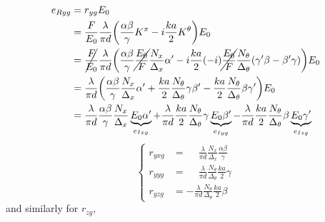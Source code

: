 \begin{align*}
    e_{\R yg}
    &= r_{yg} E_0
    \\
    &= \frac{F}{E_0}
       \frac{\lambda}{\pi d}
       \left(
           \frac{\alpha \beta}{\gamma}
           K^x
           -
           i
           \frac{ka}{2}
           K^\theta           
       \right)
       E_0
    \\
    &= \cancel{\frac{F}{E_0}}
       \frac{\lambda}{\pi d}
       \left(
           \frac{\alpha \beta}{\gamma}
           \cancel{\frac{E_0}{F}}
           \frac{N_x}{\Delta_x}
           \alpha'
           -
           i
           \frac{ka}{2}
           (-i)
           \cancel{\frac{E_0}{F}}
           \frac{N_\theta}{\Delta_\theta}
           (\gamma' \beta - \beta' \gamma)           
       \right)
       E_0
    \\
    &= \frac{\lambda}{\pi d}
       \left(
           \frac{\alpha \beta}{\gamma}
           \frac{N_x}{\Delta_x}
           \alpha'
           +
           \frac{ka}{2}
           \frac{N_\theta}{\Delta_\theta}
           \gamma
           \beta'
           -
           \frac{ka}{2}
           \frac{N_\theta}{\Delta_\theta}
           \beta
           \gamma'
       \right)
       E_0
    \\
    &= \frac{\lambda}{\pi d}
       \frac{\alpha \beta}{\gamma}
       \frac{N_x}{\Delta_x}
       \underbrace{E_0 \alpha'}_{e_{\I xg}}
       +
       \frac{\lambda}{\pi d}
       \frac{ka}{2}
       \frac{N_\theta}{\Delta_\theta}
       \gamma
       \underbrace{E_0 \beta'}_{e_{\I yg}}
       -
       \frac{\lambda}{\pi d}
       \frac{ka}{2}
       \frac{N_\theta}{\Delta_\theta}
       \beta
       \underbrace{E_0 \gamma'}_{e_{\I zg}}
\end{align*}
\begin{equation}
    \left\lbrace
    \begin{aligned}
        r_{yxg}
        &=
        \phantom{-}
        \frac{\lambda}{\pi d}
        \frac{N_x}{\Delta_x}
        \frac{\alpha \beta}{\gamma}
        \\
        r_{yyg}
        &=
        \phantom{-}
        \frac{\lambda}{\pi d}
        \frac{N_\theta}{\Delta_\theta}
        \frac{ka}{2}
        \gamma
        \\
        r_{yzg}
        &=
        -
        \frac{\lambda}{\pi d}
        \frac{N_\theta}{\Delta_\theta}
        \frac{ka}{2}
        \beta
    \end{aligned}
    \right.
\end{equation}
and similarly for $r_{zg}$,
